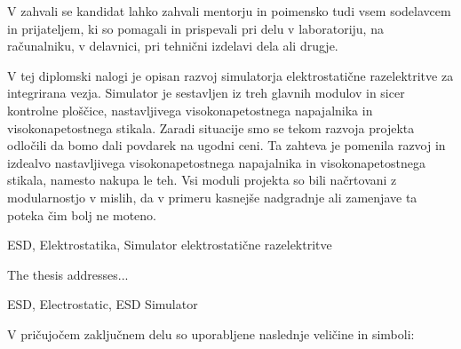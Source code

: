 \documentclass[a4paper,twoside,openright,12pt,slovene]{book}
\date{Ljubljana, \the\year}
\begin{document}
\frontmatter


\maketitle

\zahvala
V zahvali se kandidat lahko zahvali mentorju in poimensko tudi vsem sodelavcem in prijateljem, ki so pomagali in prispevali pri delu v laboratoriju, na računalniku, v delavnici, pri tehnični izdelavi dela ali drugje.

\povzetek
V tej diplomski nalogi je opisan razvoj simulatorja elektrostatične razelektritve za integrirana vezja. Simulator je sestavljen iz treh glavnih modulov in sicer kontrolne ploščice, nastavljivega visokonapetostnega napajalnika in visokonapetostnega stikala.
Zaradi situacije smo se tekom razvoja projekta odločili da bomo dali povdarek na ugodni ceni. Ta zahteva je pomenila razvoj in izdealvo nastavljivega visokonapetostnega napajalnika in visokonapetostnega stikala, namesto nakupa le teh. 
Vsi moduli projekta so bili načrtovani z modularnostjo v mislih, da v primeru kasnejše nadgradnje ali zamenjave ta poteka čim bolj ne moteno. 

\kljucnebesede
ESD, Elektrostatika, Simulator elektrostatične razelektritve



\abstract
The thesis addresses...

\keywords
ESD, Electrostatic, ESD Simulator


\tableofcontents

\seznamslik
\seznamtabel

\seznamsimbolov
V pričujočem zaključnem delu so uporabljene naslednje veličine in simboli:
\end{document}
